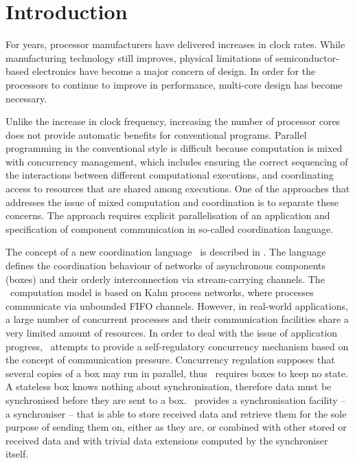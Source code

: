 \chapter{Introduction}
For years, processor manufacturers have delivered increases in clock rates. While manufacturing technology still improves, physical limitations of semiconductor-based electronics have become a major concern of design. In order for the processors to continue to improve in performance, multi-core design has become necessary.

Unlike the increase in clock frequency, increasing the number of processor cores does not provide automatic benefits for conventional programs. Parallel programming in the conventional style is difficult because computation is mixed with concurrency management, which includes ensuring the correct sequencing of the interactions between different computational executions, and coordinating access to resources that are shared among executions. One of the approaches that addresses the issue of mixed computation and coordination is to separate these concerns. The approach requires explicit parallelisation of an application and specification of component communication in so-called coordination language.

The concept of a new coordination language \ak\ is described in \cite{astrakahn}. The language defines the coordination behaviour of networks of asynchronous components (boxes) and their orderly interconnection via stream-carrying channels. The \ak\ computation model is based on Kahn process networks, where processes communicate via unbounded FIFO channels. However, in real-world applications, a large number of concurrent processes and their communication facilities share a very limited amount of resources. In order to deal with the issue of application progress, \ak\ attempts to provide a self-regulatory concurrency mechanism based on the concept of communication pressure. Concurrency regulation supposes that several copies of a box may run in parallel, thus \ak\ requires boxes to keep no state. A stateless box knows nothing about synchronisation, therefore data must be synchronised before they are sent to a box. \ak\ provides a synchronisation facility -- a synchroniser -- that is able to store received data and retrieve them for the sole purpose of sending them on, either as they are, or combined with other stored or received data and with trivial data extensions computed by the synchroniser itself.

